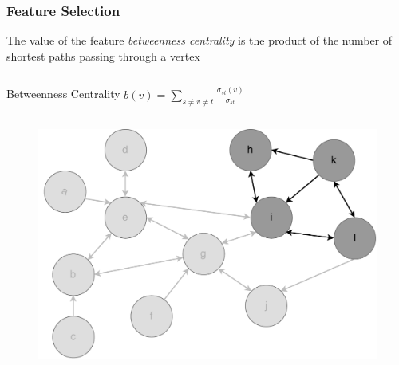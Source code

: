 \begin{frame}
\frametitle{Feature Selection}
The value of the feature \textit{betweenness centrality} is the product of the number of shortest paths passing through a vertex 
\begin{columns}\centering
\begin{column}{0.5\textwidth}
	\begin{block}{\small Betweenness Centrality}\centering
		$b(v) = \sum\limits_{s\neq v \neq t} \frac{\sigma_{st}(v)}{\sigma_{st}}$
	\end{block}
\end{column}\centering
\end{columns}
\begin{figure}
	\includegraphics[scale=0.32]{graphics/directed_network_example_betweenness.pdf}
\end{figure}

\end{frame}

